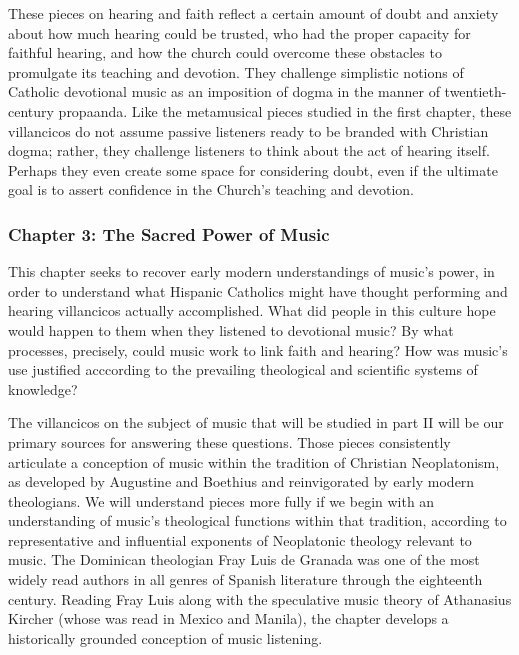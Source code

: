 \documentclass[tt]{vcbook-proposal}
\begin{document}
These pieces on hearing and faith reflect a certain amount of doubt and anxiety about how much hearing could be trusted, who had the proper capacity for faithful hearing, and how the church could overcome these obstacles to promulgate its teaching and devotion.
They challenge simplistic notions of Catholic devotional music as an imposition of dogma in the manner of twentieth-century propaanda. 
Like the metamusical pieces studied in the first chapter, these villancicos do not assume passive listeners ready to be branded with Christian dogma; rather, they challenge listeners to think about the act of hearing itself.
Perhaps they even create some space for considering doubt, even if the ultimate goal is to assert confidence in the Church's teaching and devotion.

\subsubsection{Chapter 3: The Sacred Power of Music}

This chapter seeks to recover early modern understandings of music's power, in order to understand what Hispanic Catholics might have thought performing and hearing villancicos actually accomplished.
What did people in this culture hope would happen to them when they listened to devotional music?
By what processes, precisely, could music work to link faith and hearing?
How was music's use justified acccording to the prevailing theological and scientific systems of knowledge?

The villancicos on the subject of music that will be studied in part II will be our primary sources for answering these questions.
Those pieces consistently articulate a conception of music within the tradition of Christian Neoplatonism, as developed by Augustine and Boethius and reinvigorated by early modern theologians.
We will understand pieces more fully if we begin with an understanding of music's theological functions within that tradition, according to representative and influential exponents of Neoplatonic theology relevant to music.
The Dominican theologian Fray Luis de Granada was one of the most widely read authors in all genres of Spanish literature through the eighteenth century.
Reading Fray Luis along with the speculative music theory of Athanasius Kircher (whose  was read in Mexico and Manila), the chapter develops a historically grounded conception of music listening.
\end{document}
